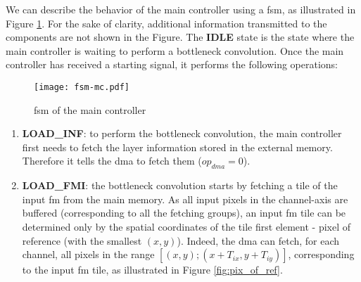 We can describe the behavior of the main controller using a \acrfull{fsm}, as illustrated in Figure \ref{fig:fsm_mc}. For the sake of clarity, additional information transmitted to the components are not shown in the Figure. The \textbf{IDLE} state is the state where the main controller is waiting to perform a bottleneck convolution. Once the main controller has received a starting signal, it performs the following operations:
%
\begin{figure}[H]
    \centering
    \texttt{[image: fsm-mc.pdf]}
    \caption{\acrshort{fsm} of the main controller}
    \label{fig:fsm_mc}
\end{figure}
%
\begin{enumerate}
    \item \textbf{LOAD\_INF}: to perform the bottleneck convolution, the main controller first needs to fetch the layer information stored in the external memory. Therefore it tells the \acrshort{dma} to fetch them ($op_{dma} = 0$).
    \item \textbf{LOAD\_FMI}: the bottleneck convolution starts by fetching a tile of the input \acrshort{fm} from the main memory. As all input pixels in the channel-axis are buffered (corresponding to all the fetching groups), an input \acrshort{fm} tile can be determined only by the spatial coordinates of the tile first element - pixel of reference (with the smallest $(x, y)$). Indeed, the \acrshort{dma} can fetch, for each channel, all pixels in the range $[(x, y); (x+T_{ix}, y+T_{iy})]$, corresponding to the input \acrshort{fm} tile, as illustrated in Figure \ref{fig:pix_of_ref}.
    

\end{enumerate}

